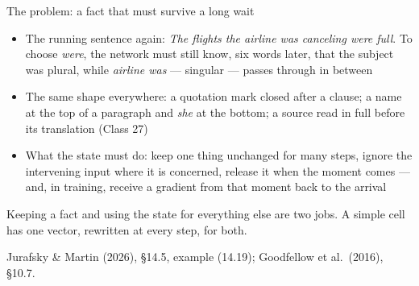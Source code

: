 \documentclass[aspectratio=169, 11pt]{beamer}
\newcommand{\srcline}[1]{%
  \par\vspace{0.25em}%
  {\scriptsize\color{mcMuted}\hfill #1\par}}
\newcommand{\src}[3]{}      %
\begin{document}
\begin{frame}{The problem: a fact that must survive a long wait}
  \src{jurafsky_slp3}{section}{14.5}
  \src{goodfellow2016}{section}{10.7}
  \vspace{-0.2em}
  {\footnotesize
  \begin{itemize}\itemsep0.25em
    \item The running sentence again: \emph{The flights the airline was
          canceling \alert{were} full}. To choose \emph{were}, the network
          must still know, six words later, that the subject was plural,
          while \emph{airline was} --- singular --- passes through in between
    \item The same shape everywhere: a quotation mark closed after a
          clause; a name at the top of a paragraph and \emph{she} at the
          bottom; a source read in full before its translation (Class 27)
    \item What the state must do: \alert{keep} one thing unchanged for
          many steps, \alert{ignore} the intervening input where it is
          concerned, \alert{release} it when the moment comes --- and, in
          training, receive a gradient from that moment back to the arrival
  \end{itemize}}
  \vspace{0.1em}
  \begin{redhighlight}
    Keeping a fact and using the state for everything else are two jobs.
    A simple cell has one vector, rewritten at every step, for both.
  \end{redhighlight}
  \srcline{Jurafsky \& Martin (2026), \S14.5, example (14.19); Goodfellow et al.\ (2016), \S10.7.}
\end{frame}
\end{document}
